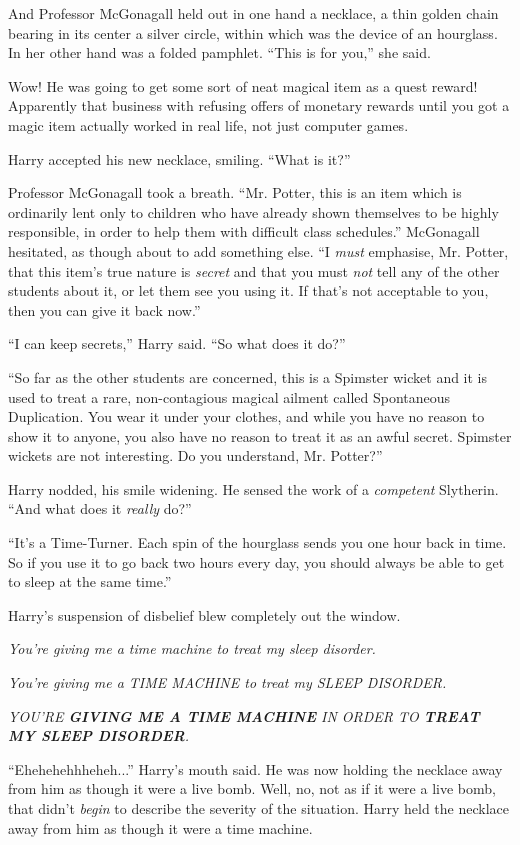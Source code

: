 And Professor McGonagall held out in one hand a necklace, a thin golden chain bearing in its center a silver circle, within which was the device of an hourglass. In her other hand was a folded pamphlet. ``This is for you,'' she said.

Wow! He was going to get some sort of neat magical item as a quest reward! Apparently that business with refusing offers of monetary rewards until you got a magic item actually worked in real life, not just computer games.

Harry accepted his new necklace, smiling. ``What is it?''

Professor McGonagall took a breath. ``Mr. Potter, this is an item which is ordinarily lent only to children who have already shown themselves to be highly responsible, in order to help them with difficult class schedules.'' McGonagall hesitated, as though about to add something else. ``I \emph{must} emphasise, Mr. Potter, that this item's true nature is \emph{secret} and that you must \emph{not} tell any of the other students about it, or let them see you using it. If that's not acceptable to you, then you can give it back now.''

``I can keep secrets,'' Harry said. ``So what does it do?''

``So far as the other students are concerned, this is a Spimster wicket and it is used to treat a rare, non-contagious magical ailment called Spontaneous Duplication. You wear it under your clothes, and while you have no reason to show it to anyone, you also have no reason to treat it as an awful secret. Spimster wickets are not interesting. Do you understand, Mr. Potter?''

Harry nodded, his smile widening. He sensed the work of a \emph{competent} Slytherin. ``And what does it \emph{really} do?''

``It's a Time-Turner. Each spin of the hourglass sends you one hour back in time. So if you use it to go back two hours every day, you should always be able to get to sleep at the same time.''

Harry's suspension of disbelief blew completely out the window.

\emph{You're giving me a time machine to treat my sleep disorder.}

\emph{You're giving me a TIME MACHINE to treat my SLEEP DISORDER.}

\emph{YOU'RE \textbf{GIVING ME A TIME MACHINE} IN ORDER TO \textbf{TREAT MY SLEEP DISORDER}.}

``Ehehehehhheheh...'' Harry's mouth said. He was now holding the necklace away from him as though it were a live bomb. Well, no, not as if it were a live bomb, that didn't \emph{begin} to describe the severity of the situation. Harry held the necklace away from him as though it were a time machine.

